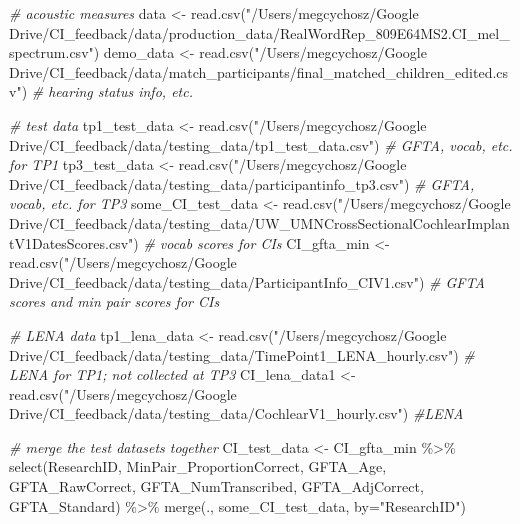 \documentclass[
]{article}
\newenvironment{Shaded}{\begin{snugshade}}{\end{snugshade}}
\newcommand{\AttributeTok}[1]{\textcolor[rgb]{0.77,0.63,0.00}{#1}}
\newcommand{\CommentTok}[1]{\textcolor[rgb]{0.56,0.35,0.01}{\textit{#1}}}
\newcommand{\FunctionTok}[1]{\textcolor[rgb]{0.00,0.00,0.00}{#1}}
\newcommand{\NormalTok}[1]{#1}
\newcommand{\OtherTok}[1]{\textcolor[rgb]{0.56,0.35,0.01}{#1}}
\newcommand{\SpecialCharTok}[1]{\textcolor[rgb]{0.00,0.00,0.00}{#1}}
\newcommand{\StringTok}[1]{\textcolor[rgb]{0.31,0.60,0.02}{#1}}
\begin{document}
\begin{Shaded}
\begin{Highlighting}[]
\CommentTok{\# acoustic measures}
\NormalTok{data }\OtherTok{\textless{}{-}} \FunctionTok{read.csv}\NormalTok{(}\StringTok{"/Users/megcychosz/Google Drive/CI\_feedback/data/production\_data/RealWordRep\_809E64MS2.CI\_mel\_spectrum.csv"}\NormalTok{)}
\NormalTok{demo\_data }\OtherTok{\textless{}{-}} \FunctionTok{read.csv}\NormalTok{(}\StringTok{"/Users/megcychosz/Google Drive/CI\_feedback/data/match\_participants/final\_matched\_children\_edited.csv"}\NormalTok{) }\CommentTok{\# hearing status info, etc.}

\CommentTok{\# test data}
\NormalTok{tp1\_test\_data }\OtherTok{\textless{}{-}} \FunctionTok{read.csv}\NormalTok{(}\StringTok{"/Users/megcychosz/Google Drive/CI\_feedback/data/testing\_data/tp1\_test\_data.csv"}\NormalTok{) }\CommentTok{\# GFTA, vocab, etc. for TP1}
\NormalTok{tp3\_test\_data }\OtherTok{\textless{}{-}} \FunctionTok{read.csv}\NormalTok{(}\StringTok{"/Users/megcychosz/Google Drive/CI\_feedback/data/testing\_data/participantinfo\_tp3.csv"}\NormalTok{) }\CommentTok{\# GFTA, vocab, etc. for TP3}
\NormalTok{some\_CI\_test\_data }\OtherTok{\textless{}{-}} \FunctionTok{read.csv}\NormalTok{(}\StringTok{"/Users/megcychosz/Google Drive/CI\_feedback/data/testing\_data/UW\_UMNCrossSectionalCochlearImplantV1DatesScores.csv"}\NormalTok{) }\CommentTok{\# vocab scores for CIs}
\NormalTok{CI\_gfta\_min }\OtherTok{\textless{}{-}} \FunctionTok{read.csv}\NormalTok{(}\StringTok{"/Users/megcychosz/Google Drive/CI\_feedback/data/testing\_data/ParticipantInfo\_CIV1.csv"}\NormalTok{) }\CommentTok{\#  GFTA scores and min pair scores for CIs}

\CommentTok{\# LENA data}
\NormalTok{tp1\_lena\_data }\OtherTok{\textless{}{-}} \FunctionTok{read.csv}\NormalTok{(}\StringTok{"/Users/megcychosz/Google Drive/CI\_feedback/data/testing\_data/TimePoint1\_LENA\_hourly.csv"}\NormalTok{) }\CommentTok{\# LENA for TP1; not collected at TP3}
\NormalTok{CI\_lena\_data1 }\OtherTok{\textless{}{-}} \FunctionTok{read.csv}\NormalTok{(}\StringTok{"/Users/megcychosz/Google Drive/CI\_feedback/data/testing\_data/CochlearV1\_hourly.csv"}\NormalTok{) }\CommentTok{\#LENA}

\CommentTok{\# merge the test datasets together}
\NormalTok{CI\_test\_data }\OtherTok{\textless{}{-}}\NormalTok{ CI\_gfta\_min }\SpecialCharTok{\%\textgreater{}\%}
  \FunctionTok{select}\NormalTok{(ResearchID, MinPair\_ProportionCorrect, GFTA\_Age,}
\NormalTok{         GFTA\_RawCorrect, GFTA\_NumTranscribed, GFTA\_AdjCorrect, GFTA\_Standard) }\SpecialCharTok{\%\textgreater{}\%}
  \FunctionTok{merge}\NormalTok{(., some\_CI\_test\_data, }\AttributeTok{by=}\StringTok{"ResearchID"}\NormalTok{)}


\end{Highlighting}
\end{Shaded}
\end{document}
